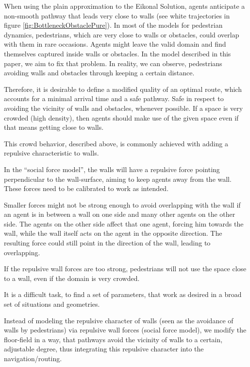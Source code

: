 When using the plain approximation to the Eikonal Solution, agents anticipate a non-smooth pathway that leads very close to 
walls (see white trajectories in figure \ref{fig:BottleneckObstaclePure}). In most of the models for pedestrian dynamics, pedestrians, which are very close to walls or obstacles, could overlap with them in rare occasions. Agents might leave the valid domain and find themselves captured inside walls or obstacles. In the model described in this paper, we aim to fix that
problem. In reality, we can observe, pedestrians avoiding walls and obstacles through keeping a certain distance. 

Therefore, it is desirable to define a modified quality of an optimal route, which accounts for a minimal arrival time and a safe pathway. Safe in respect to avoiding the vicinity of walls and obstacles, whenever possible. If a space is very crowded (high density), then agents should make use of the given space even if that means getting close to walls.

This crowd behavior, described above, is commonly achieved with adding a repulsive characteristic to walls.

In the ``social force model'', the walls will have a repulsive force pointing perpendicular to the wall-surface, aiming to keep agents away from the wall. These forces need to be calibrated to work as intended.

Smaller forces might not be strong enough to avoid overlapping with the wall if an agent is in between a wall on one side and many other agents on the other side. The agents on the other side affect that one agent, forcing him towards the wall, while the wall itself acts on the agent in the opposite direction. The resulting force could still point in the direction of the wall, leading to overlapping.

If the repulsive wall forces are too strong, pedestrians will not use the space close to a wall, even if the domain is very crowded.

It is a difficult task, to find a set of parameters, that work as desired in a broad set of situations and geometries.

Instead of modeling the repulsive character of walls (seen as the avoidance of walls by pedestrians) via repulsive wall forces (social force model), we modify the floor-field in a way, that pathways avoid the vicinity of walls to a certain, adjustable degree, thus integrating this repulsive character into the navigation/routing.

